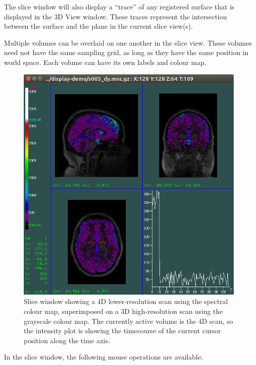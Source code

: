 \documentclass[11pt,letterpaper]{article}
\begin{document}
The slice window will also display a ``trace'' of any registered
surface that is displayed in the 3D View window. These traces
represent the intersection between the surface and the plane in the
current slice view(s).

Multiple volumes can be overlaid on one another in the slice
view. These volumes need not have the same sampling grid, as long as
they have the same position in world space. Each volume can have its own
labels and colour map.

\begin{figure}
\centering
\includegraphics[width=0.8\linewidth]{display-2vol.png}
\caption{Slice window showing a 4D lower-resolution scan using the
  spectral colour map, superimposed on a 3D high-resolution scan using
  the grayscale colour map. The currently active volume is the 4D scan,
  so the intensity plot is showing the timecourse of the current
  cursor position along the time axis.}
\label{slice2Vol}
\end{figure}

In the slice window, the following mouse operations are available:
\end{document}
